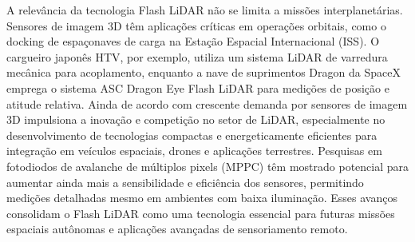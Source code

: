 A relevância da tecnologia Flash LiDAR não se limita a missões interplanetárias. Sensores de imagem 3D têm aplicações críticas em operações orbitais, como o docking de espaçonaves de carga na Estação Espacial Internacional (ISS). O cargueiro japonês HTV, por exemplo, utiliza um sistema LiDAR de varredura mecânica para acoplamento, enquanto a nave de suprimentos Dragon da SpaceX emprega o sistema ASC Dragon Eye Flash LiDAR para medições de posição e atitude relativa. Ainda de acordo com \cite{mizuno2020} crescente demanda por sensores de imagem 3D impulsiona a inovação e competição no setor de LiDAR, especialmente no desenvolvimento de tecnologias compactas e energeticamente eficientes para integração em veículos espaciais, drones e aplicações terrestres. Pesquisas em fotodiodos de avalanche de múltiplos pixels (MPPC) têm mostrado potencial para aumentar ainda mais a sensibilidade e eficiência dos sensores, permitindo medições detalhadas mesmo em ambientes com baixa iluminação. Esses avanços consolidam o Flash LiDAR como uma tecnologia essencial para futuras missões espaciais autônomas e aplicações avançadas de sensoriamento remoto.


